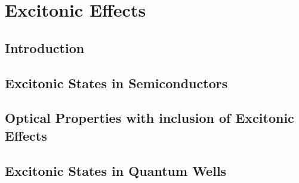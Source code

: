 \chapter{Excitonic Effects}
\section{Introduction}
\section{Excitonic States in Semiconductors}
\section{Optical Properties with inclusion of Excitonic Effects}
\section{Excitonic States in Quantum Wells}